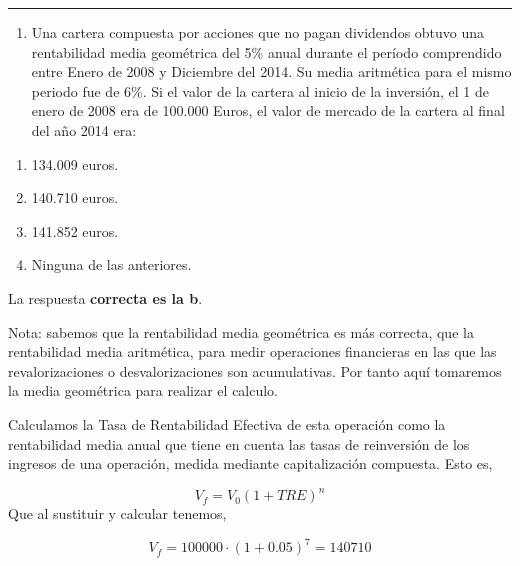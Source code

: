 \documentclass[
  letterpaper,
  DIV=11,
  numbers=noendperiod]{scrreprt}
\providecommand{\tightlist}{%
  \setlength{\itemsep}{0pt}\setlength{\parskip}{0pt}}\usepackage{longtable,booktabs,array}
\begin{document}
\begin{center}\rule{0.5\linewidth}{0.5pt}\end{center}

\begin{enumerate}
\def\labelenumi{\arabic{enumi}.}
\setcounter{enumi}{53}
\tightlist
\item
  Una cartera compuesta por acciones que no pagan dividendos obtuvo una
  rentabilidad media geométrica del 5\% anual durante el período
  comprendido entre Enero de 2008 y Diciembre del 2014. Su media
  aritmética para el mismo periodo fue de 6\%. Si el valor de la cartera
  al inicio de la inversión, el 1 de enero de 2008 era de 100.000 Euros,
  el valor de mercado de la cartera al final del año 2014 era:
\end{enumerate}

\begin{enumerate}
\def\labelenumi{\alph{enumi}.}
\item
  134.009 euros.
\item
  140.710 euros.
\item
  141.852 euros.
\item
  Ninguna de las anteriores.
\end{enumerate}

\begin{tcolorbox}[enhanced jigsaw, left=2mm, opacityback=0, colback=white, breakable, arc=.35mm, bottomrule=.15mm, rightrule=.15mm, toprule=.15mm, leftrule=.75mm, colframe=quarto-callout-tip-color-frame]
\begin{minipage}[t]{5.5mm}
\textcolor{quarto-callout-tip-color}{\faLightbulb}
\end{minipage}%
\begin{minipage}[t]{\textwidth - 5.5mm}

La respuesta \textbf{correcta es la b}.

Nota: sabemos que la rentabilidad media geométrica es más correcta, que
la rentabilidad media aritmética, para medir operaciones financieras en
las que las revalorizaciones o desvalorizaciones son acumulativas. Por
tanto aquí tomaremos la media geométrica para realizar el calculo.

Calculamos la Tasa de Rentabilidad Efectiva de esta operación como la
rentabilidad media anual que tiene en cuenta las tasas de reinversión de
los ingresos de una operación, medida mediante capitalización compuesta.
Esto es,

\[V_f=V_0\left(1+TRE\right)^n\] Que al sustituir y calcular tenemos,

\[V_f=100000\cdot\left(1+0.05\right)^{7}=140710\]

\end{minipage}%
\end{tcolorbox}
\end{document}
